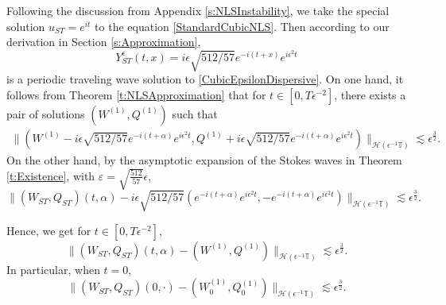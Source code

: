 \documentclass[12pt]{amsart}
\theoremstyle{remark}
\theoremstyle{definition}
\numberwithin{equation}{section}
\newcommand{\e}{\epsilon}
\newcommand{\T}{\mathbb{T}}
\renewcommand{\H}{{\mathcal H }}
\newcommand{\f}{\frac}
\begin{document}
Following the discussion from Appendix \ref{s:NLSInstability}, we take the special solution $u_{ST} = e^{it}$ to the equation \eqref{StandardCubicNLS}.
Then according to our derivation in Section \ref{s:Approximation},
\begin{equation*}
  Y^\e_{ST}(t,x) = i\e \sqrt{512/57} e^{-i(t+x)}e^{i\e^2t}
\end{equation*}
is a periodic traveling wave solution to \eqref{CubicEpsilonDispersive}.
On one hand, it follows from Theorem \ref{t:NLSApproximation} that for $t\in[0, T\epsilon^{-2}]$, there exists a pair of solutions $(W^{(1)}, Q^{(1)})$ such that
\begin{align*}
\|(W^{(1)}-i\e \sqrt{512/57} e^{-i(t+\alpha)}e^{i\e^2t},Q^{(1)}+i\e \sqrt{512/57}e^{-i(t+\alpha)}e^{i\e^2t})\|_{\H(\e^{-1}\T)}\lesssim  \e^{\f32}.
\end{align*}
On the other hand, by the asymptotic expansion of the Stokes waves in Theorem \ref{t:Existence}, with $ \varepsilon = \sqrt{\frac{512}{57}}\epsilon$, 
\begin{equation} \label{512Constant}
 \|(W_{ST},Q_{ST})(t,\alpha ) - i\e \sqrt{512/57}(e^{-i(t+\alpha)}e^{i\e^2t}, - e^{-i(t+\alpha)}e^{i\e^2t})  \|_{\H(\epsilon^{-1}\T)}\lesssim   \e^{\f32}.  
\end{equation}


Hence, we get for $t\in [0, T\epsilon^{-2}]$,
\begin{equation*}
  \|(W_{ST},Q_{ST})(t,\alpha ) - (W^{(1)}, Q^{(1)})  \|_{\H(\epsilon^{-1}\T)}\lesssim \e^{\f32}.  
\end{equation*}
In particular, when $t=0$,  
\begin{equation*}
  \|(W_{ST},Q_{ST})(0, \cdot) - (W^{(1)}_0, Q^{(1)}_0)  \|_{\H(\epsilon^{-1}\T)}\lesssim \e^{\f32}.  
\end{equation*}
\end{document}

